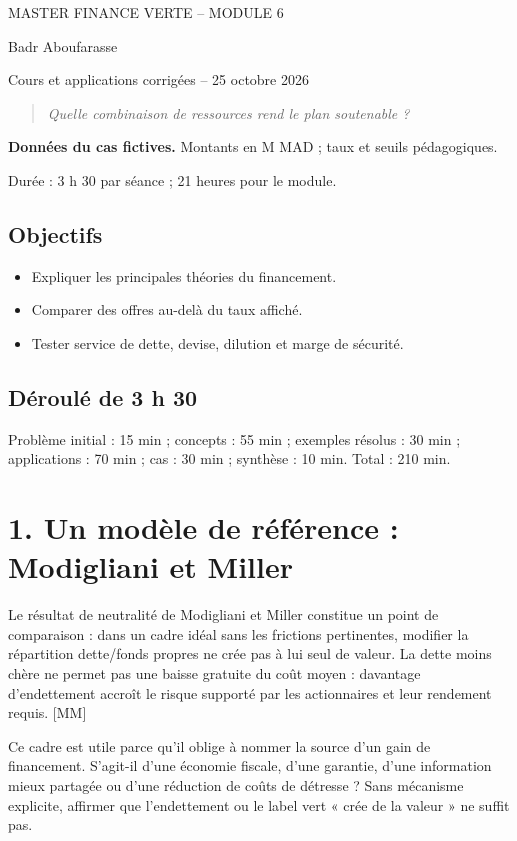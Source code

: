 \documentclass[12pt,a4paper]{article}
\begin{document}
\begin{center}{\small MASTER FINANCE VERTE -- MODULE 6}\par\vspace{8pt}{\Large\bfseries Séance 3 -- Structure du capital et choix de financement}\par\vspace{6pt}Badr Aboufarasse\par{\small Cours et applications corrigées -- 25 octobre 2026}\end{center}
\begin{quote}\itshape Quelle combinaison de ressources rend le plan soutenable ?\end{quote}
\textbf{Données du cas fictives.} Montants en M MAD ; taux et seuils pédagogiques.\par Durée : 3 h 30 par séance ; 21 heures pour le module.

\subsection*{Objectifs}
\begin{itemize}\item Expliquer les principales théories du financement.\item Comparer des offres au-delà du taux affiché.\item Tester service de dette, devise, dilution et marge de sécurité.\end{itemize}
\subsection*{Déroulé de 3 h 30}
Problème initial : 15 min ; concepts : 55 min ; exemples résolus : 30 min ; applications : 70 min ; cas : 30 min ; synthèse : 10 min. Total : 210 min.

\section*{1. Un modèle de référence : Modigliani et Miller}
Le résultat de neutralité de Modigliani et Miller constitue un point de comparaison : dans un cadre idéal sans les frictions pertinentes, modifier la répartition dette/fonds propres ne crée pas à lui seul de valeur. La dette moins chère ne permet pas une baisse gratuite du coût moyen : davantage d’endettement accroît le risque supporté par les actionnaires et leur rendement requis. [MM]


Ce cadre est utile parce qu’il oblige à nommer la source d’un gain de financement. S’agit-il d’une économie fiscale, d’une garantie, d’une information mieux partagée ou d’une réduction de coûts de détresse ? Sans mécanisme explicite, affirmer que l’endettement ou le label vert « crée de la valeur » ne suffit pas.
\end{document}
